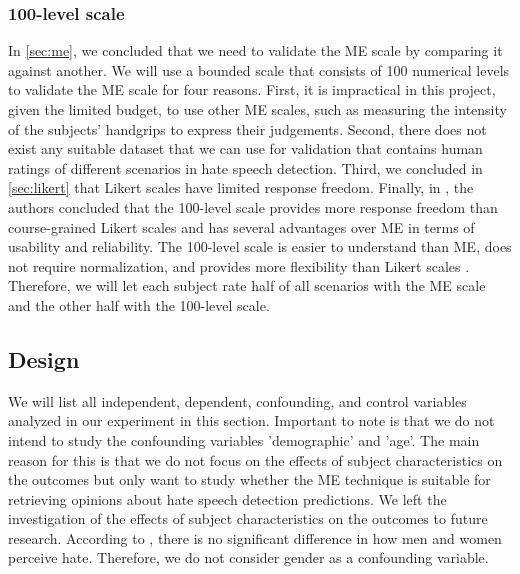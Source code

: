 \documentclass[a4paper]{article}
\begin{document}
\subsubsection{100-level scale}
In \ref{sec:me}, we concluded that we need to validate the ME scale by comparing it against another. We will use a bounded scale that consists of 100 numerical levels to validate the ME scale for four reasons. First, it is impractical in this project, given the limited budget, to use other ME scales, such as measuring the intensity of the subjects' handgrips to express their judgements. Second, there does not exist any suitable dataset that we can use for validation that contains human ratings of different scenarios in hate speech detection. Third, we concluded in \ref{sec:likert} that Likert scales have limited response freedom. Finally, in \cite{roitero2018fine}, the authors concluded that the 100-level scale provides more response freedom than course-grained Likert scales and has several advantages over ME in terms of usability and reliability. The 100-level scale is easier to understand than ME, does not require normalization, and provides more flexibility than Likert scales \cite{roitero2018fine}. Therefore, we will let each subject rate half of all scenarios with the ME scale and the other half with the 100-level scale.

\subsection{Design}
We will list all independent, dependent, confounding, and control variables analyzed in our experiment in this section. Important to note is that we do not intend to study the confounding variables 'demographic' and 'age'. The main reason for this is that we do not focus on the effects of subject characteristics on the outcomes but only want to study whether the ME technique is suitable for retrieving opinions about hate speech detection predictions. We left the investigation of the effects of subject characteristics on the outcomes to future research. According to \cite{gold2018women}, there is no significant difference in how men and women perceive hate. Therefore, we do not consider gender as a confounding variable.
\end{document}
